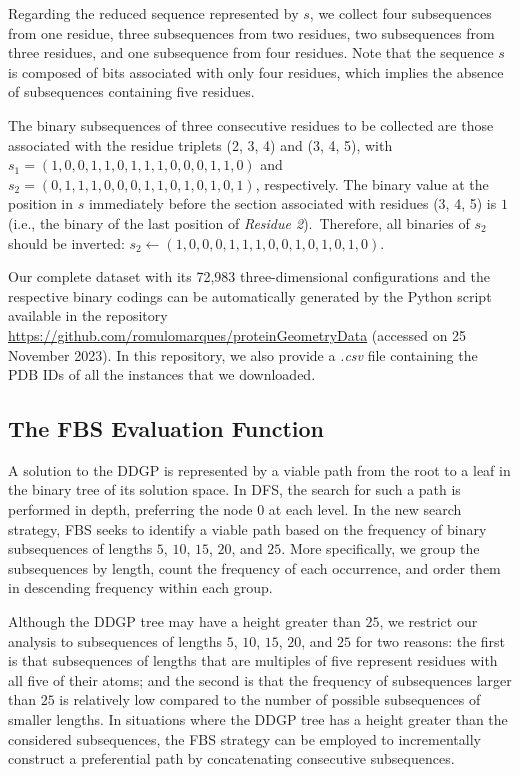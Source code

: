 \documentclass[journal=jacsat,manuscript=article]{achemso}
\begin{document}
Regarding the reduced sequence represented by $s$, we collect four subsequences from one residue, three subsequences from two residues, two subsequences from three residues, and one subsequence from four residues. Note that the sequence $s$ is composed of bits associated with only four residues, which implies the absence of subsequences containing five residues.

The binary subsequences of three consecutive residues to be collected are those associated with the residue triplets (2, 3, 4) and (3, 4, 5), with $s_1 = (1, 0, 0, 1, 1, 0, 1, 1, 1, 0, 0, 0, 1, 1, 0)$ and $s_2 = (0, 1, 1, 1, 0, 0, 0, 1, 1, 0, 1, 0, 1, 0, 1)$, respectively. The binary value at the position in $s$ immediately before the section associated with residues (3, 4, 5) is $1$ (i.e., the binary of the last position of \emph{Residue 2}).~Therefore, all binaries of $s_2$ should be inverted: $s_2 \leftarrow (1, 0, 0, 0, 1, 1, 1, 0, 0, 1, 0, 1, 0, 1, 0)$.

Our complete dataset with its 72,983 three-dimensional configurations and the respective binary codings can be automatically generated by the Python script available in the repository \url{https://github.com/romulomarques/proteinGeometryData} (accessed on 25 November 2023). In this repository, we also provide a \emph{.csv} file containing the PDB IDs of all the instances that we downloaded.

\subsection{The FBS Evaluation Function}

A solution to the DDGP is represented by a viable path from the root to a leaf in the binary tree of its solution space. In DFS, the search for such a path is performed in depth, preferring the node $0$ at each level. In the new search strategy, FBS seeks to identify a viable path based on the frequency of binary subsequences of lengths $5$, $10$, $15$, $20$, and $25$. More specifically, we group the subsequences by {length}, count the frequency of each occurrence, and order them in descending frequency within each group.

Although the DDGP tree may have a height greater than $25$, we restrict our analysis to subsequences of {lengths} $5$, $10$, $15$, $20$, and $25$ for two reasons: the first is that subsequences of lengths that are multiples of five represent residues with all five of their atoms; and the second is that the frequency of subsequences larger than $25$ is relatively low compared to the number of possible subsequences of smaller {lengths}. In situations where the DDGP tree has a height greater than the considered subsequences, the FBS strategy can be employed to incrementally construct a preferential path by concatenating consecutive subsequences.
\end{document}
